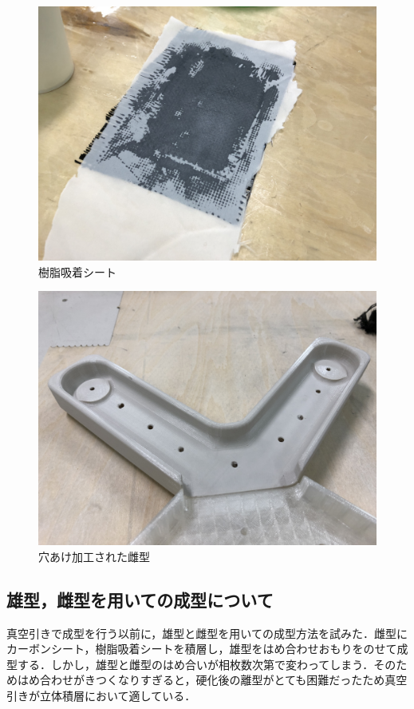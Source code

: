 \begin{figure}[htbp]
  \begin{center}
    \includegraphics[width=120mm]{img/２５.JPG}
    \end{center}
  \caption{樹脂吸着シート}
 \label{fig:robot}
\end{figure}

\begin{figure}[htbp]
  \begin{center}
    \includegraphics[width=120mm]{img/２６.JPG}
    \end{center}
  \caption{穴あけ加工された雌型}
 \label{fig:robot}
\end{figure}

\subsection{雄型，雌型を用いての成型について}
真空引きで成型を行う以前に，雄型と雌型を用いての成型方法を試みた．雌型にカーボンシート，樹脂吸着シートを積層し，雄型をはめ合わせおもりをのせて成型する．しかし，雄型と雌型のはめ合いが相枚数次第で変わってしまう．そのためはめ合わせがきつくなりすぎると，硬化後の離型がとても困難だったため真空引きが立体積層において適している．

